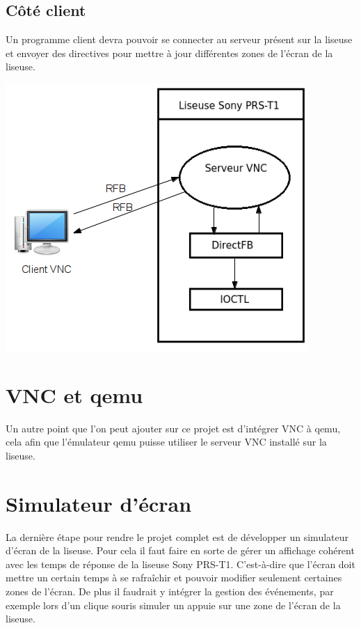 \subsection{Côté client}

Un programme client devra pouvoir se connecter au serveur présent sur la liseuse et envoyer des directives pour mettre à jour différentes zones de l'écran de la liseuse.

\begin{center}
	\includegraphics{VNCClientServeur.png}
\end{center}

\section{VNC et qemu}

Un autre point que l'on peut ajouter sur ce projet est d'intégrer VNC à qemu, cela afin que l'émulateur qemu puisse utiliser le serveur VNC installé sur la liseuse.


\section{Simulateur d'écran}

La dernière étape pour rendre le projet complet est de développer un simulateur d'écran de la liseuse. Pour cela il faut faire en sorte de gérer un affichage cohérent avec les temps de réponse de la liseuse Sony PRS-T1. C'est-à-dire que l'écran doit mettre un certain temps à se rafraîchir et pouvoir modifier seulement certaines zones de l'écran. De plus il faudrait y intégrer la gestion des événements, par exemple lors d'un clique souris simuler un appuie sur une zone de l'écran de la liseuse.

